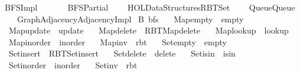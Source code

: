 %
\begin{isabellebody}%
%
%
\isadelimtheory
%
\endisadelimtheory
%
\isatagtheory
{}\isamarkupfalse%
\ BFS{\isacharunderscore}{\kern0pt}Impl\isanewline
\ \ \isanewline
\ \ \ \ BFS{\isacharunderscore}{\kern0pt}Partial\isanewline
\ \ \ \ {\isachardoublequoteopen}HOL{\isacharminus}{\kern0pt}Data{\isacharunderscore}{\kern0pt}Structures{\isachardot}{\kern0pt}RBT{\isacharunderscore}{\kern0pt}Set{}{\isachardoublequoteclose}\isanewline
\ \ \ \ {\isachardoublequoteopen}{\isachardot}{\kern0pt}{\isachardot}{\kern0pt}{\isacharslash}{\kern0pt}Queue{\isacharslash}{\kern0pt}Queue{\isachardoublequoteclose}\isanewline
\ \ \ \ {\isachardoublequoteopen}{\isachardot}{\kern0pt}{\isachardot}{\kern0pt}{\isacharslash}{\kern0pt}Graph{\isacharslash}{\kern0pt}Adjacency{\isacharslash}{\kern0pt}Adjacency{\isacharunderscore}{\kern0pt}Impl{\isachardoublequoteclose}\isanewline
{}%
\endisatagtheory
{\isafoldtheory}%
%
\isadelimtheory
\isanewline
%
\endisadelimtheory
\isanewline
{}\isamarkupfalse%
\ B{\isacharcolon}{\kern0pt}\ bfs\ \isanewline
\ \ Map{\isacharunderscore}{\kern0pt}empty\ {\isacharequal}{\kern0pt}\ empty\ \isanewline
\ \ Map{\isacharunderscore}{\kern0pt}update\ {\isacharequal}{\kern0pt}\ update\ \isanewline
\ \ Map{\isacharunderscore}{\kern0pt}delete\ {\isacharequal}{\kern0pt}\ RBT{\isacharunderscore}{\kern0pt}Map{\isachardot}{\kern0pt}delete\ \isanewline
\ \ Map{\isacharunderscore}{\kern0pt}lookup\ {\isacharequal}{\kern0pt}\ lookup\ \isanewline
\ \ Map{\isacharunderscore}{\kern0pt}inorder\ {\isacharequal}{\kern0pt}\ inorder\ \isanewline
\ \ Map{\isacharunderscore}{\kern0pt}inv\ {\isacharequal}{\kern0pt}\ rbt\ \isanewline
\ \ Set{\isacharunderscore}{\kern0pt}empty\ {\isacharequal}{\kern0pt}\ empty\ \isanewline
\ \ Set{\isacharunderscore}{\kern0pt}insert\ {\isacharequal}{\kern0pt}\ RBT{\isacharunderscore}{\kern0pt}Set{\isachardot}{\kern0pt}insert\ \isanewline
\ \ Set{\isacharunderscore}{\kern0pt}delete\ {\isacharequal}{\kern0pt}\ delete\ \isanewline
\ \ Set{\isacharunderscore}{\kern0pt}isin\ {\isacharequal}{\kern0pt}\ isin\ \isanewline
\ \ Set{\isacharunderscore}{\kern0pt}inorder\ {\isacharequal}{\kern0pt}\ inorder\ \isanewline
\ \ Set{\isacharunderscore}{\kern0pt}inv\ {\isacharequal}{\kern0pt}\ rbt\ \isanewline

\end{isabellebody}
